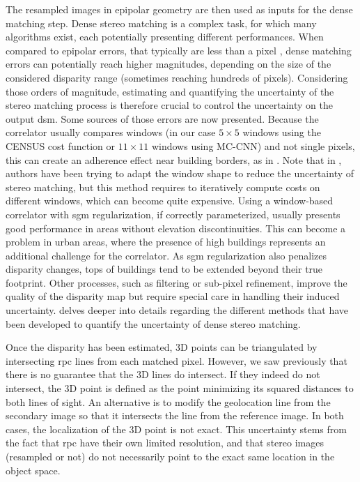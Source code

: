 The resampled images in epipolar geometry are then used as inputs for the dense matching step. Dense stereo matching is a complex task, for which many algorithms exist, each potentially presenting different performances. When compared to epipolar errors, that typically are less than a pixel \cite{franchis_automatic_2014}, dense matching errors can potentially reach higher magnitudes, depending on the size of the considered disparity range (sometimes reaching hundreds of pixels). Considering those orders of magnitude, estimating and quantifying the uncertainty of the stereo matching process is therefore crucial to control the uncertainty on the output \acrshort{dsm}. Some sources of those errors are now presented. Because the correlator usually compares windows (in our case $5\times5$ windows using the CENSUS cost function or $11\times11$ windows using MC-CNN) and not single pixels, this can create an adherence effect near building borders, as in . Note that in \cite{okutomi_stereo_1994}, authors have been trying to adapt the window shape to reduce the uncertainty of stereo matching, but this method requires to iteratively compute costs on different windows, which can become quite expensive. Using a window-based correlator with \acrshort{sgm} regularization, if correctly parameterized, usually presents good performance in areas without elevation discontinuities. This can become a problem in urban areas, where the presence of high buildings represents an additional challenge for the correlator. As \acrshort{sgm} regularization also penalizes disparity changes, tops of buildings tend to be extended beyond their true footprint. Other processes, such as filtering or sub-pixel refinement, improve the quality of the disparity map but require special care in handling their induced uncertainty.  delves deeper into details regarding the different methods that have been developed to quantify the uncertainty of dense stereo matching.

Once the disparity has been estimated, 3D points can be triangulated by intersecting \acrshort{rpc} lines from each matched pixel. However, we saw previously that there is no guarantee that the 3D lines do intersect. If they indeed do not intersect, the 3D point is defined as the point minimizing its squared distances to both lines of sight. An alternative is to modify the geolocation line from the secondary image so that it intersects the line from the reference image. In both cases, the localization of the 3D point is not exact. This uncertainty stems from the fact that \acrshort{rpc} have their own limited resolution, and that stereo images (resampled or not) do not necessarily point to the exact same location in the object space.

